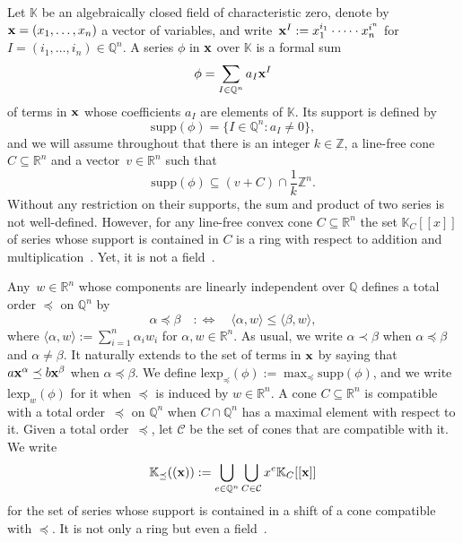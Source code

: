 \documentclass[a4paper,draft]{amsart}
\let\set\mathbb
\theoremstyle{definition}
\begin{document}
Let $\mathbb{K}$ be an algebraically closed field of characteristic zero, denote by $\bold{x} = (x_1,\dots,x_n)$ a vector of variables, and write~$\bold{x}^I:=x_1^{i_1}\cdot \dots \cdot x_n^{i^n}$ for $I = (i_1,\dots,i_n)\in\mathbb{Q}^n$. A series $\phi$ in $\bold{x}$ over $\mathbb{K}$ is a formal sum 
\begin{equation*}
\phi = \sum_{I\in\mathbb{Q}^n} a_I \bold{x}^I
\end{equation*}
of terms in $\bold{x}$ whose coefficients $a_I$ are elements of $\mathbb{K}$.
Its support is defined by 
\begin{equation*}
\mathrm{supp}(\phi) = \{I\in\mathbb{Q}^n: a_I \neq 0 \},
\end{equation*}
and we will assume throughout that there is an integer $k\in\mathbb{Z}$, a line-free cone $C\subseteq\mathbb{R}^n$ and a vector~$v\in\mathbb{R}^n$ such that 
\begin{equation*}
\mathrm{supp}(\phi) \subseteq \left( v + C \right) \cap \frac{1}{k}\mathbb{Z}^n.
\end{equation*}
Without any restriction on their supports, the sum and product of two series is not well-defined. However, for any line-free convex cone $C\subseteq\mathbb{R}^n$ the set $\mathbb{K}_C[[x]]$ of series whose support is contained in $C$ is a ring with respect to addition and multiplication~\cite[Theorem 10]{monforte2013formal}. Yet, it is not a field~\cite[Theorem 12]{monforte2013formal}.

Any~$w\in\mathbb{R}^n$ whose components are linearly independent over $\mathbb{Q}$ defines a total order $\preceq$ on $\mathbb{Q}^n$ by
\begin{equation*}
\alpha \preceq \beta \quad :\Longleftrightarrow \quad \langle \alpha, w\rangle \leq \langle \beta, w\rangle,
\end{equation*}
where $\langle \alpha,w \rangle := \sum_{i=1}^n \alpha_i w_i$ for $\alpha,w\in\mathbb{R}^n$. As usual, we write $\alpha \prec \beta$ when $\alpha\preceq \beta$ and $\alpha \neq \beta$. It naturally extends to the set of terms in $\bold{x}$ by saying that $a \bold{x}^\alpha \preceq b \bold{x}^\beta$ when $\alpha \preceq \beta$. We define $\mathrm{lexp}_\preceq(\phi) := \max_\preceq \mathrm{supp}(\phi)$, and we write $\mathrm{lexp}_w(\phi)$ for it when $\preceq$ is induced by $w\in\mathbb{R}^n$.
 A cone $C\subseteq \mathbb{R}^n$ is compatible with a total order~$\preceq$ on $\mathbb{Q}^n$ when $C\cap \mathbb{Q}^n$ has a maximal element with respect to it. Given a total order~$\preceq$, let $\mathcal{C}$ be the set of cones that are compatible with it. We write 
\begin{equation*}
\mathbb{K}_{\preceq}((\bold{x})):= \bigcup_{e\in\set Q^n}\bigcup_{C\in\mathcal{C}} x^e \mathbb{K}_C[[\bold{x}]]
\end{equation*} 
for the set of series whose support is contained in a shift of a cone compatible with $\preceq$. It is not only a ring but even a field~\cite[Theorem 15]{monforte2013formal}.\\ 
\end{document}
